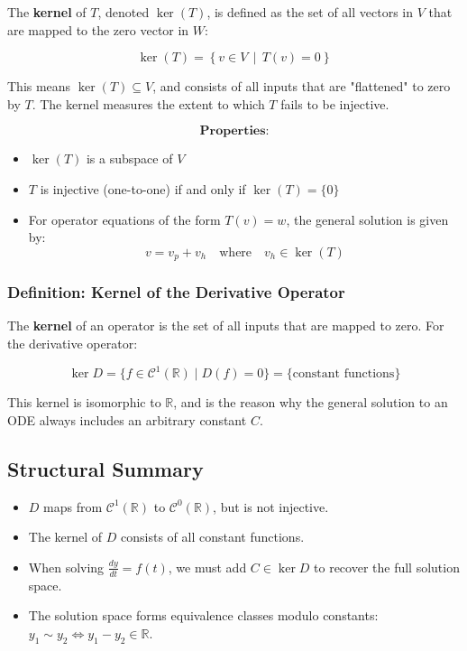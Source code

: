 \documentclass[12pt]{article}
\begin{document}
	The \textbf{kernel} of \( T \), denoted \( \ker(T) \), is defined as the set of all vectors in \( V \) that are mapped to the zero vector in \( W \):
	
	$$
	\ker(T) = \left\{ v \in V \,\middle|\, T(v) = 0 \right\}
	$$
	
	This means \( \ker(T) \subseteq V \), and consists of all inputs that are "flattened" to zero by \( T \). The kernel measures the extent to which \( T \) fails to be injective.
	
	$$
	\textbf{Properties:}
	$$
	
	\begin{itemize}
		\item \( \ker(T) \) is a subspace of \( V \)
		\item \( T \) is injective (one-to-one) if and only if \( \ker(T) = \{0\} \)
		\item For operator equations of the form \( T(v) = w \), the general solution is given by:
		$$
		v = v_p + v_h \quad \text{where} \quad v_h \in \ker(T)
		$$
	\end{itemize}
	
	
	\subsubsection{Definition: Kernel of the Derivative Operator}
	
	The \textbf{kernel} of an operator is the set of all inputs that are mapped to zero. For the derivative operator:
	
	$$
	\ker D = \{ f \in \mathcal{C}^1(\mathbb{R}) \mid D(f) = 0 \} = \{ \text{constant functions} \}
	$$
	
	This kernel is isomorphic to $\mathbb{R}$, and is the reason why the general solution to an ODE always includes an arbitrary constant $C$.
	
	\subsection{Structural Summary}
	
	\begin{itemize}
		\item $D$ maps from $\mathcal{C}^1(\mathbb{R})$ to $\mathcal{C}^0(\mathbb{R})$, but is not injective.
		\item The kernel of $D$ consists of all constant functions.
		\item When solving $\frac{dy}{dt} = f(t)$, we must add $C \in \ker D$ to recover the full solution space.
		\item The solution space forms equivalence classes modulo constants: $y_1 \sim y_2 \iff y_1 - y_2 \in \mathbb{R}$.
	\end{itemize}
	
\end{document}
